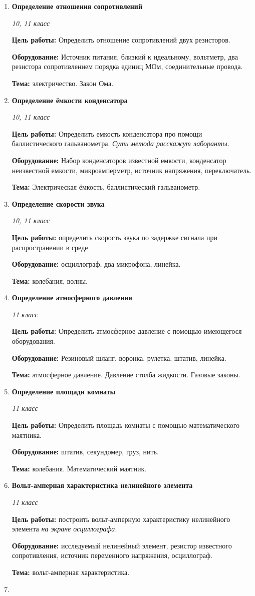 \documentclass[a4paper,10pt]{article}
\newcommand{\labtitle}[5]{
	\textbf{#2}\par
	\textit{#1 класс}\par
	\textbf{Цель работы:} #3\par
	\textbf{Оборудование:} #4\par
	\textbf{Тема:} #5
}
\begin{document}
\begin{enumerate}
	\item \labtitle
		{10, 11}
		{Определение отношения сопротивлений}
		{Определить отношение сопротивлений двух резисторов.}
		{Источник питания, близкий к идеальному, вольтметр, два резистора сопротивлением порядка единиц МОм, соединительные провода.}
		{электричество. Закон Ома.}
	\item \labtitle
		{10, 11}
		{Определение ёмкости конденсатора}
		{Определить емкость конденсатора про помощи баллистического гальванометра. \textit{Суть метода расскажут лаборанты.}}
		{Набор конденсаторов известной емкости, конденсатор неизвестной емкости, микроамперметр, источник напряжения, переключатель.}
		{Электрическая ёмкость, баллистический гальванометр.}
	\item \labtitle
		{10, 11}
		{Определение скорости звука}
		{определить скорость звука по задержке сигнала при распространении в среде}
		{осциллограф, два микрофона, линейка.}
		{колебания, волны.}
	\item \labtitle
		{11}
		{Определение атмосферного давления}
		{Определить атмосферное давление с помощью имеющегося оборудования.}
		{Резиновый шланг, воронка, рулетка, штатив, линейка.}
		{атмосферное давление. Давление столба жидкости. Газовые законы.}
	\item \labtitle
		{11}
		{Определение площади комнаты}
		{Определить площадь комнаты с помощью математического маятника.}
		{штатив, секундомер, груз, нить.}
		{колебания. Математический маятник.}
	\item \labtitle
		{11}
		{Вольт-амперная характеристика нелинейного элемента}
		{построить вольт-амперную характеристику нелинейного элемента \textit{на экране осциллографа.}}
		{исследуемый нелинейный элемент, резистор известного сопротивления, источник переменного напряжения, осциллограф.}
		{вольт-амперная характеристика. }
	\item \labtitle

\end{enumerate}
\end{document}
